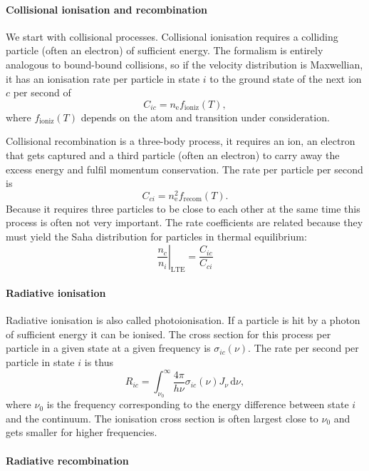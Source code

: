 \documentclass[12pt]{article}
\numberwithin{equation}{section}
\def\dd{\mathrm{d}}
\def\Jnu{\ensuremath{J_{\nu}}}
\newcommand{\be}{\begin{equation}}
\newcommand{\ee}{\end{equation}}
\begin{document}
\paragraph{Collisional ionisation and recombination}

We start with collisional processes. Collisional ionisation requires a colliding particle (often an electron) of sufficient energy. The formalism is entirely analogous to bound-bound collisions, so if the velocity distribution is Maxwellian, it has an ionisation rate per particle in state $i$ to the ground state of the next ion $c$ per second of
\be
C_{ic} = n_\mathrm{e} f_\mathrm{ioniz}(T),
\ee
where $f_\mathrm{ioniz}(T)$ depends on the atom and transition under consideration.

Collisional recombination is a three-body process, it requires an ion, an electron that gets captured and a third particle (often an electron) to carry away the excess energy and fulfil momentum conservation. The rate per particle per second is
\be
C_{ci} = n^2_\mathrm{e} f_\mathrm{recom}(T).
\ee
Because it requires three particles to be close to each other at the same time this process is often not very important. The rate coefficients are related because they must yield the Saha distribution for particles in thermal equilibrium:
\be
\left. \frac{n_c}{n_i} \right|_\mathrm{LTE}   =  \frac{C_{ic}}{C_{ci}}
\ee 

\paragraph{Radiative ionisation}

Radiative ionisation is also called photoionisation. If a particle is hit by a photon of sufficient energy it can be ionised. The cross section for this process per particle in a given state at a given frequency is $\sigma_{ic}(\nu)$. The rate per second per particle in state $i$ is thus
\be
R_{ic} = \int_{\nu_0}^\infty \frac{4 \pi}{h \nu} \sigma_{ic}(\nu) \Jnu \, \dd \nu,
\ee
where $\nu_0$ is the frequency corresponding to the energy difference between state $i$ and the continuum. The ionisation cross section is often largest close to $\nu_0$ and gets smaller for higher frequencies.

\paragraph{Radiative recombination}
\end{document}
